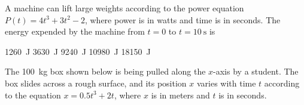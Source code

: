 \documentclass{../../oss-apphys-exam}
\newcounter{lastmc}
\begin{document}
\begin{multicols*}{2}
\begin{questions}
    \question A machine can lift large weights according to the power equation
    $P(t)=4t^3+3t^2-2$, where power is in watts and time is in seconds. The
    energy expended by the machine from $t=0$ to $t=\SI{10}{\second}$ is
    \begin{choices}
      \choice \SI{1260}{\joule}
      \choice \SI{3630}{\joule}
      \choice \SI{9240}{\joule}
      \choice \SI{10980}{\joule}
      \choice \SI{18150}{\joule}
    \end{choices}
  \end{questions}
  \setcounter{lastmc}{\value{question}}
\end{multicols*}
\newpage


\begin{questions}
  \setcounter{question}{\value{lastmc}}

  \question The \SI{100}{\kilo\gram} box shown below is being pulled along the
  $x$-axis by a student. The box slides across a rough surface, and its
  position $x$ varies with time $t$ according to the equation
  $x= 0.5t^3+2t$, where $x$ is in meters and $t$ is in seconds.
  \newpage
  

\end{questions}
\end{document}
